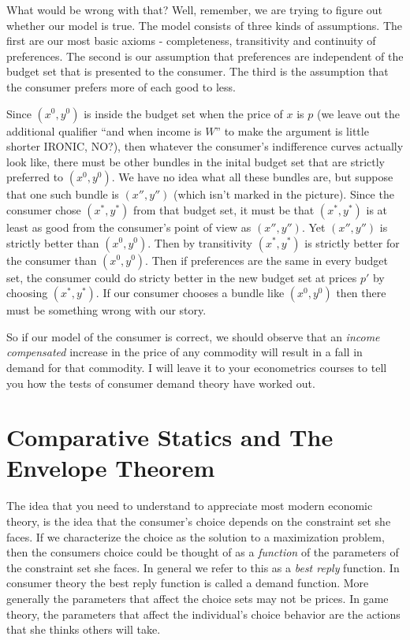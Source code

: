\documentclass[12pt]{article}
\newcommand{\tmem}[1]{\textit{#1}}
\begin{document}
What would be wrong with that? Well, remember, we are trying to figure out
whether our model is true. The model consists of three kinds of assumptions.
The first are our most basic axioms - completeness, transitivity and
continuity of preferences. The second is our assumption that preferences are
independent of the budget set that is presented to the consumer. The third is
the assumption that the consumer prefers more of each good to less.

Since $( x^0, y^0 )$ is inside the budget set when the price of $x$ is $p$ (we
leave out the additional qualifier ``and when income is $W$'' to make the
argument is little shorter IRONIC, NO?), then whatever the consumer's indifference curves
actually look like, there must be other bundles in the inital budget set that
are strictly preferred to $( x^0, y^0 )$. We have no idea what all these
bundles are, but suppose that one such bundle is $( x'', y'' )$ (which isn't
marked in the picture). Since the consumer chose $( x^{\ast}, y^{\ast} )$ from
that budget set, it must be that $( x^{\ast}, y^{\ast} )$ is at least as good
from the consumer's point of view as $( x'', y'' )$. Yet $( x'', y'' )$ is
strictly better than $( x^0, y^0 )$. Then by transitivity $( x^{\ast},
y^{\ast} )$ is strictly better for the consumer than $( x^0, y^0 ) .$ Then if
preferences are the same in every budget set, the consumer could do stricty
better in the new budget set at prices $p'$ by choosing $( x^{\ast}, y^{\ast}
)$. If our consumer chooses a bundle like $( x^0, y^0 )$ then there must be
something wrong with our story.

So if our model of the consumer is correct, we should observe that an
{\tmem{income compensated}} increase in the price of any commodity will result
in a fall in demand for that commodity. I will leave it to your econometrics
courses to tell you how the tests of consumer demand theory have worked out.

\section{Comparative Statics and The Envelope Theorem}

The idea that you need to understand to appreciate most modern economic
theory, is the idea that the consumer's choice depends on the constraint set
she faces. If we characterize the choice as the solution to a maximization
problem, then the consumers choice could be thought of as a {\tmem{function}}
of the parameters of the constraint set she faces. In general we refer to this
as a {\tmem{best reply}} function. In consumer theory the best reply function
is called a demand function. More generally the parameters that affect the
choice sets may not be prices. In game theory, the parameters that affect the
individual's choice behavior are the actions that she thinks others will take.
\end{document}
